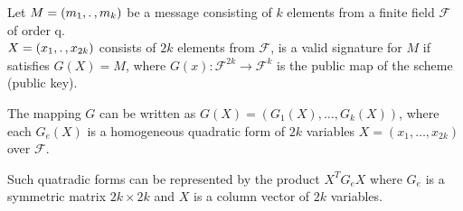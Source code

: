 \noindent
Let $M= (m_1, \ldotp, m_k)$ be a message consisting of $k$ elements from a finite field $\mathcal{F}$ of order q.\\
$X = (x_1, \ldotp, x_{2k})$ consists of $2k$ elements from $\mathcal{F}$, is a valid signature for $M$ if satisfies $G(X) = M$, where $G(x): \mathcal{F}^{2k} \to \mathcal{F}^k$ is the public map of the scheme (public key).
\medskip

\noindent
The mapping $G$ can be written as $G(X) = (G_1(X), \ldots, G_k(X))$, where each $G_e(X)$ is a homogeneous quadratic form of $2k$ variables $X = (x_1, \ldots, x_{2k})$ over $\mathcal{F}$.
\bigskip

\noindent
Such quatradic forms can be represented by the product $X^T G_eX$ where $G_e$ is a symmetric matrix $2k \times 2k$ and $X$ is a column vector of $2k$ variables.\\
\medskip

